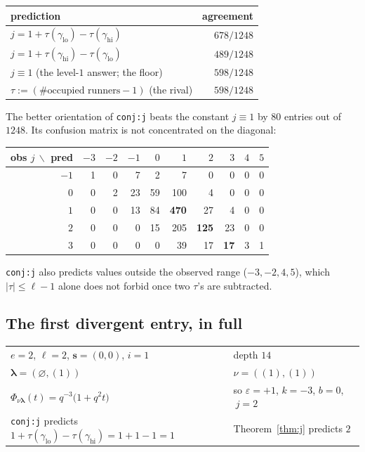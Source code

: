\documentclass[11pt]{article}
\theoremstyle{definition}
\theoremstyle{remark}
\newcommand{\bl}{\boldsymbol{\lambda}}
\newcommand{\bs}{\mathbf{s}}
\begin{document}
\begin{center}
\begin{tabular}{lr}
\hline
prediction & agreement \\
\hline
$j=1+\tau(\gamma_{\mathrm{lo}})-\tau(\gamma_{\mathrm{hi}})$ & $678/1248$ \\
$j=1+\tau(\gamma_{\mathrm{hi}})-\tau(\gamma_{\mathrm{lo}})$ & $489/1248$ \\
$j\equiv1$ (the level-$1$ answer; the floor) & $598/1248$ \\
$\tau:=(\#\text{occupied runners}-1)$ (the rival) & $598/1248$ \\
\hline
\end{tabular}
\end{center}

The better orientation of \texttt{conj:j} beats the constant $j\equiv1$ by $80$ entries
out of $1248$. Its confusion matrix is not concentrated on the diagonal:

\begin{center}
\begin{tabular}{r|rrrrrrrrr}
obs $j\ \backslash$ pred & $-3$ & $-2$ & $-1$ & $0$ & $1$ & $2$ & $3$ & $4$ & $5$\\
\hline
$-1$ & 1 & 0 & 7 & 2 & 7 & 0 & 0 & 0 & 0\\
$0$ & 0 & 2 & 23 & 59 & 100 & 4 & 0 & 0 & 0\\
$1$ & 0 & 0 & 13 & 84 & \textbf{470} & 27 & 4 & 0 & 0\\
$2$ & 0 & 0 & 0 & 15 & 205 & \textbf{125} & 23 & 0 & 0\\
$3$ & 0 & 0 & 0 & 0 & 39 & 17 & \textbf{17} & 3 & 1\\
\end{tabular}
\end{center}

\texttt{conj:j} also predicts values outside the observed range ($-3,-2,4,5$), which
$|\tau|\le\ell-1$ alone does not forbid once two $\tau$'s are subtracted.

\subsection{The first divergent entry, in full}

\begin{center}
\begin{tabular}{ll}
$e=2$, $\ell=2$, $\bs=(0,0)$, $i=1$ & depth $14$\\
$\bl=(\varnothing,(1))$ & $\nu=((1),(1))$\\
$\Phi_{\nu\bl}(t)=q^{-3}\big(1+q^{2}t\big)$ & so $\varepsilon=+1$, $k=-3$, $b=0$,
$\ j=2$\\
\texttt{conj:j} predicts $1+\tau(\gamma_{\mathrm{lo}})-\tau(\gamma_{\mathrm{hi}})=1+1-1=1$
& Theorem~\ref{thm:j} predicts $2$\\
\end{tabular}
\end{center}
\end{document}
